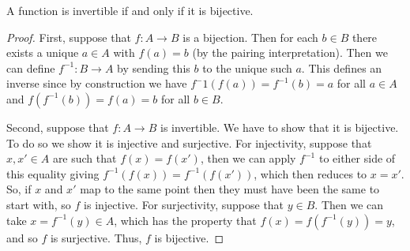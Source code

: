 \documentclass[fleqn]{LectureClass/LectureClass}
\begin{document}
    \begin{thm}{}{}
        A function is invertible if and only if it is bijective.
        \begin{proof}
            First, suppose that \(f \colon A \to B\) is a bijection.
            Then for each \(b \in B\) there exists a unique \(a \in A\) with \(f(a) = b\) (by the pairing interpretation).
            Then we can define \(f^{-1} \colon B \to A\) by sending this \(b\) to the unique such \(a\).
            This defines an inverse since by construction we have \(f^-1(f(a)) = f^{-1}(b) = a\) for all \(a \in A\) and \(f(f^{-1}(b)) = f(a) = b\) for all \(b \in B\).
            
            Second, suppose that \(f \colon A \to B\) is invertible.
            We have to show that it is bijective.
            To do so we show it is injective and surjective.
            For injectivity, suppose that \(x, x' \in A\) are such that \(f(x) = f(x')\), then we can apply \(f^{-1}\) to either side of this equality giving \(f^{-1}(f(x)) = f^{-1}(f(x'))\), which then reduces to \(x = x'\).
            So, if \(x\) and \(x'\) map to the same point then they must have been the same to start with, so \(f\) is injective.
            For surjectivity, suppose that \(y \in B\).
            Then we can take \(x = f^{-1}(y) \in A\), which has the property that \(f(x) = f(f^{-1}(y)) = y\), and so \(f\) is surjective.
            Thus, \(f\) is bijective.
        \end{proof}
    \end{thm}
\end{document}
